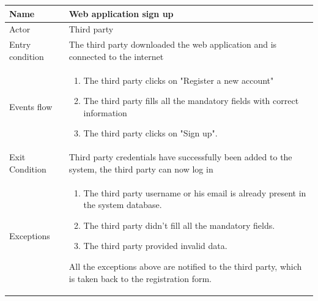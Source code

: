 \begin{table}[p]
\centering
\begin{tabular}{|l|p{11cm}|}
    \hline
    Name & Web application sign up
    \\ \hline
    Actor & Third party
    \\ \hline 
    Entry condition & The third party downloaded the web application and is connected to the internet
    \\ \hline
    Events flow &
    \begin{enumerate}
    \item The third party clicks on "Register a new account"
    \item The third party fills all the mandatory fields with correct information
    \item The third party clicks on "Sign up".
    \end{enumerate}
     \\ \hline
     Exit Condition & Third party credentials have successfully been added to the system,
     the third party can now log in     
     \\
    \hline
    Exceptions &
        \begin{enumerate}
    \item The third party username or his email is already present in the system database.
    \item The third party didn't fill all the mandatory fields.
    \item The third party provided invalid data.
    \end{enumerate}
    All the exceptions above are notified to the third party, which is taken back to the registration form.
      \\
    \hline
\end{tabular}
\end{table}

